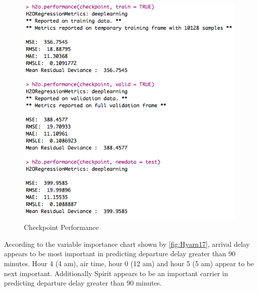 \documentclass[12pt,twoside]{amherstthesis}
\begin{document}
  \begin{figure}[htbp]
  \centering
  \includegraphics[scale = 0.7,angle = 0]{figure/DeepGridCheckpoint.png}
  \caption[Checkpoint Performance]{\normalsize{Checkpoint Performance}}
  \label{fig:Hyarn143}
  \end{figure}
  
  According to the variable importance chart shown by
  \autoref{fig:Hyarn17}, arrival delay appears to be most important in
  predicting departure delay greater than 90 minutes. Hour 4 (4 am), air
  time, hour 0 (12 am) and hour 5 (5 am) appear to be next important.
  Additionally Spirit appears to be an important carrier in predicting
  departure delay greater than 90 minutes.
  
\end{document}
